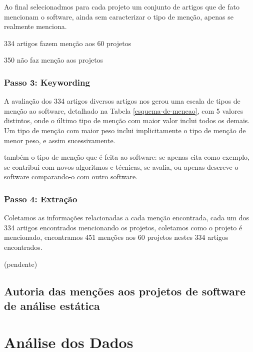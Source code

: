 Ao final selecionadmos para cada projeto um conjunto de artigos que de fato
mencionam o software, ainda sem caracterizar o tipo de menção, apenas se
realmente menciona.

334 artigos fazem menção aos 60 projetos

350 não faz menção aos projetos

\subsubsection{Passo 3: Keywording}

A avaliação dos 334 artigos diversos artigos nos gerou uma escala de tipos de menção ao
software, detalhado na Tabela \ref{esquema-de-mencao}, com 5 valores
distintos, onde o último tipo de menção com maior valor inclui todos os demais.
Um tipo de menção com maior peso inclui implicitamente o tipo de
menção de menor peso, e assim sucessivamente.

também o tipo de menção que é feita ao software: se apenas cita como exemplo,
se contribui com novos algoritmos e técnicas, se avalia, ou apenas descreve o
software comparando-o com outro software.

\subsubsection{Passo 4: Extração}

Coletamos as informações relacionadas a cada menção encontrada, cada um dos 334
artigos encontrados mencionando os projetos, coletamos como o projeto é
mencionado, encontramos 451 menções aos 60 projetos nestes 334 artigos
encontrados.

% 
% 
% 
% 

(pendente)



\subsection{Autoria das menções aos projetos de software de análise estática}

\section{Análise dos Dados} %

